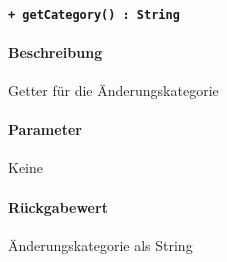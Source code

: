 \paragraph{\texttt{+ getCategory() : String}}%
\paragraph*{Beschreibung}
Getter für die Änderungskategorie
\paragraph*{Parameter}
Keine
\paragraph*{Rückgabewert}
Änderungskategorie als String
